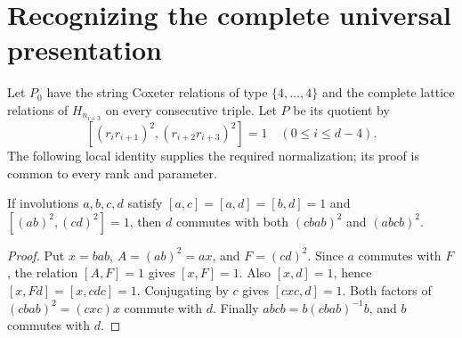 \section{Recognizing the complete universal presentation}
Let $P_0$ have the string Coxeter relations of type $\{4,\ldots,4\}$
and the complete lattice relations of $H_{n_{i+3}}$ on every consecutive
triple. Let $P$ be its quotient by
\[
 [(r_i r_{i+1})^2,(r_{i+2}r_{i+3})^2]=1
       \quad(0\le i\le d-4).                             \tag{5}
\]
The following local identity supplies the required normalization; its proof
is common to every rank and parameter.

\begin{lemma}
If involutions $a,b,c,d$ satisfy $[a,c]=[a,d]=[b,d]=1$ and
$[(ab)^2,(cd)^2]=1$, then $d$ commutes with both $(cbab)^2$ and
$(abcb)^2$.
\end{lemma}
\begin{proof}
Put $x=bab$, $A=(ab)^2=ax$, and $F=(cd)^2$. Since $a$ commutes with
$F$, the relation $[A,F]=1$ gives $[x,F]=1$. Also $[x,d]=1$, hence
$[x,Fd]=[x,cdc]=1$. Conjugating by $c$ gives $[cxc,d]=1$.
Both factors of $(cbab)^2=(cxc)x$ commute with $d$. Finally
$abcb=b(cbab)^{-1}b$, and $b$ commutes with $d$.
\end{proof}


